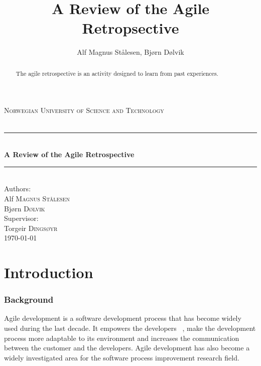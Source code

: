 \documentclass[12pt]{article}
\newcommand{\HRule}{\rule{\linewidth}{0.5mm}}
\begin{document}
\title{A Review of the Agile Retropsective}

\author{Alf Magnus Stålesen, Bjørn Dølvik}
\begin{titlepage}
\begin{center}

\textsc{\LARGE Norwegian University of Science and Technology}\\[1.5cm]

\textsc{\Large }\\[0.5cm]

\HRule \\[0.4cm]
{ \huge \bfseries A Review of the Agile Retrospective\\[0.4cm] }

\HRule \\[1.5cm]

{\large Authors:}\\

Alf \textsc{Magnus Stålesen}\\
Bjørn \textsc{Dølvik}\\[1.0cm]

{\large Supervisor:}\\

Torgeir \textsc{Dingsøyr}\\[1.0cm]

{\large \today}

\end{center}
\end{titlepage}

\begin{abstract}

The agile retrospective is an activity designed to learn from past experiences. 

\end{abstract}
\clearpage

\tableofcontents
\clearpage

\part{Introduction}
\section{Background}
Agile development is a software development process that has become widely used during the last decade. It empowers the developers ~\cite{Tessem2014}, make the development process more adaptable to its environment and increases the communication between the customer and the developers. Agile development has also become a widely investigated area for the software process improvement research field.  
\end{document}
